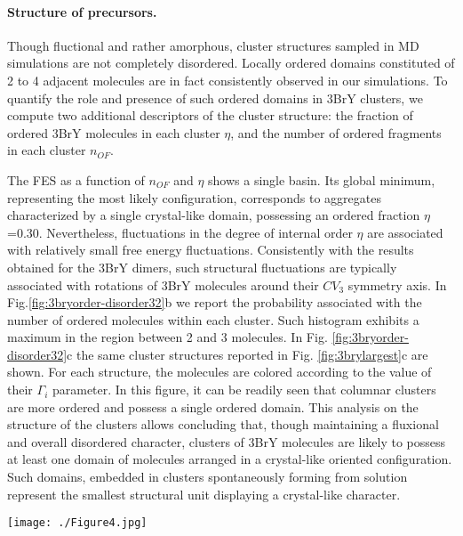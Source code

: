 \documentclass[journal=cgdefu,manuscript=article,layout=twocolumn]{achemso}
\begin{document}
\paragraph{Structure of precursors.} Though fluctional and rather amorphous, cluster structures sampled in MD simulations are not completely disordered.
Locally ordered domains constituted of 2 to 4 adjacent molecules are in fact consistently observed in our simulations.
To quantify the role and presence of such ordered domains in 3BrY clusters, we compute two additional descriptors of the cluster structure: the fraction of ordered 3BrY molecules in each cluster $\eta$, and the number of ordered fragments in each cluster $n_{OF}$.
 
The FES as a function of $n_{OF}$ and $\eta$ shows a single basin. Its global minimum, representing the most likely configuration, corresponds to aggregates characterized by a single crystal-like domain, possessing an ordered fraction $\eta$=0.30. Nevertheless, fluctuations in the degree of internal order $\eta$ are associated with relatively small free energy fluctuations. 
Consistently with the results obtained for the 3BrY dimers, such structural fluctuations are typically associated with rotations of 3BrY molecules around their $CV_3$ symmetry axis. 
In Fig.\ref{fig:3bryorder-disorder32}b we report the probability associated with the number of ordered molecules within each cluster. Such histogram exhibits a maximum in the region between 2 and 3 molecules. 
In Fig. \ref{fig:3bryorder-disorder32}c the same cluster structures reported in Fig. \ref{fig:3brylargest}c are shown. For each structure, the molecules are colored according to the value of their $\Gamma_i$ parameter. In this figure, it can be readily seen that columnar clusters are more ordered and possess a single ordered domain. This analysis on the structure of the clusters allows concluding that, though maintaining a fluxional and overall disordered character, clusters of 3BrY molecules are likely to possess at least one domain of molecules arranged in a crystal-like oriented configuration.  Such domains, embedded in clusters spontaneously forming from solution represent the smallest structural unit displaying a crystal-like character. 

\begin{figure*}[ht!]
\centering
\texttt{[image: ./Figure4.jpg]}
\caption{Simulation B. A) FES as a function of the ratio of ordered molecules $\eta$ and the number of ordered fragments $n_{OF}$ in the precursor. 
The stable minimum corresponds to structures with $\eta\approx$ 0.35. B) Size distribution of an ordered sub-domain in the largest cluster. C) Examples of structures of different sizes are reported, in which each molecule is colored according to its $\Gamma_i$ parameter (a red-white-blue color scale was used with $\Gamma_i=$0 corresponding to red and $\Gamma_i=$1 corresponding to blue).}
\label{fig:3bryorder-disorder32}
\end{figure*}  
\end{document}
